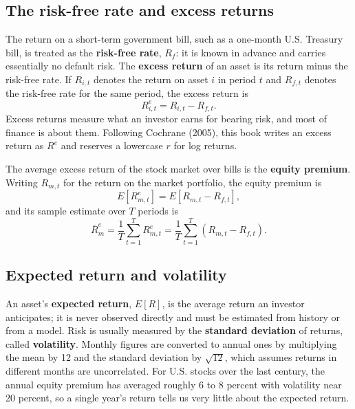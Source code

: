 \subsection{The risk-free rate and excess returns}
\label{sec:01-rf}

The return on a short-term government bill, such as a one-month U.S. Treasury bill, is treated as the \textbf{risk-free rate}, $R_f$: it is known in advance and carries essentially no default risk. 
The \textbf{excess return} of an asset is its return minus the risk-free rate. If $R_{i,t}$ denotes the return on asset $i$ in period $t$ and $R_{f,t}$ denotes the risk-free rate for the same period, the excess return is
\begin{equation}
R^{e}_{i,t} = R_{i,t} - R_{f,t}.
\label{eq:excess-return}
\end{equation}
Excess returns measure what an investor earns for bearing risk, and most of finance is about them. Following Cochrane (2005), this book writes an excess return as $R^{e}$ and reserves a lowercase $r$ for log returns.

The average excess return of the stock market over bills is the \textbf{equity premium}. Writing $R_{m,t}$ for the return on the market portfolio, the equity premium is
\begin{equation}
E\left[R^{e}_{m,t}\right] = E\left[R_{m,t} - R_{f,t}\right],
\label{eq:equity-premium}
\end{equation}
and its sample estimate over $T$ periods is
\begin{equation}
\bar{R}^{e}_{m} = \frac{1}{T}\sum_{t=1}^{T} R^{e}_{m,t} = \frac{1}{T}\sum_{t=1}^{T}\left(R_{m,t} - R_{f,t}\right).
\label{eq:equity-premium-sample}
\end{equation}




\subsection{Expected return and volatility}
\label{sec:01-expret}

An asset's \textbf{expected return}, $E[R]$, is the average return an investor anticipates; it is never observed directly and must be estimated from history or from a model. Risk is usually measured by the \textbf{standard deviation} of returns, called \textbf{volatility}. Monthly figures are converted to annual ones by multiplying the mean by 12 and the standard deviation by $\sqrt{12}$, which assumes returns in different months are uncorrelated. For U.S. stocks over the last century, the annual equity premium has averaged roughly 6 to 8 percent with volatility near 20 percent, so a single year's return tells us very little about the expected return.


